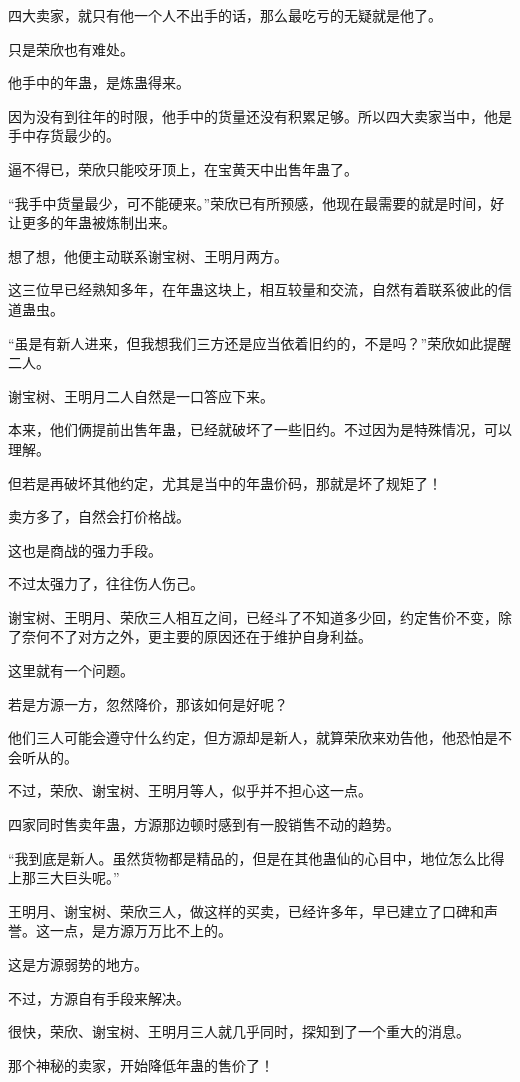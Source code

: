 \begin{this_body}
四大卖家，就只有他一个人不出手的话，那么最吃亏的无疑就是他了。

只是荣欣也有难处。

他手中的年蛊，是炼蛊得来。

因为没有到往年的时限，他手中的货量还没有积累足够。所以四大卖家当中，他是手中存货最少的。

逼不得已，荣欣只能咬牙顶上，在宝黄天中出售年蛊了。

“我手中货量最少，可不能硬来。”荣欣已有所预感，他现在最需要的就是时间，好让更多的年蛊被炼制出来。

想了想，他便主动联系谢宝树、王明月两方。

这三位早已经熟知多年，在年蛊这块上，相互较量和交流，自然有着联系彼此的信道蛊虫。

“虽是有新人进来，但我想我们三方还是应当依着旧约的，不是吗？”荣欣如此提醒二人。

谢宝树、王明月二人自然是一口答应下来。

本来，他们俩提前出售年蛊，已经就破坏了一些旧约。不过因为是特殊情况，可以理解。

但若是再破坏其他约定，尤其是当中的年蛊价码，那就是坏了规矩了！

卖方多了，自然会打价格战。

这也是商战的强力手段。

不过太强力了，往往伤人伤己。

谢宝树、王明月、荣欣三人相互之间，已经斗了不知道多少回，约定售价不变，除了奈何不了对方之外，更主要的原因还在于维护自身利益。

这里就有一个问题。

若是方源一方，忽然降价，那该如何是好呢？

他们三人可能会遵守什么约定，但方源却是新人，就算荣欣来劝告他，他恐怕是不会听从的。

不过，荣欣、谢宝树、王明月等人，似乎并不担心这一点。

四家同时售卖年蛊，方源那边顿时感到有一股销售不动的趋势。

“我到底是新人。虽然货物都是精品的，但是在其他蛊仙的心目中，地位怎么比得上那三大巨头呢。”

王明月、谢宝树、荣欣三人，做这样的买卖，已经许多年，早已建立了口碑和声誉。这一点，是方源万万比不上的。

这是方源弱势的地方。

不过，方源自有手段来解决。

很快，荣欣、谢宝树、王明月三人就几乎同时，探知到了一个重大的消息。

那个神秘的卖家，开始降低年蛊的售价了！


\end{this_body}
